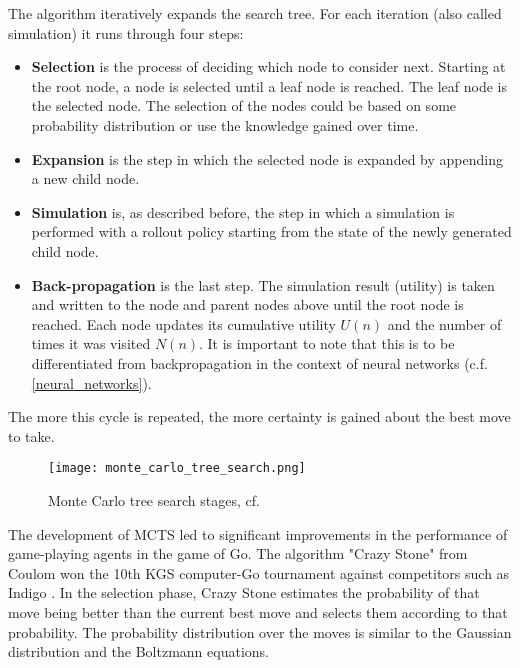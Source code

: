 The algorithm iteratively expands the search tree. For each iteration (also called simulation) it runs through four steps:
\begin{itemize}
    \item \textbf{Selection} is the process of deciding which node to consider next. Starting at the root node, a node is selected until a leaf node is reached. The leaf node is the selected node. The selection of the nodes could be based on some probability distribution or use the knowledge gained over time.

    \item \textbf{Expansion} is the step in which the selected node is expanded by appending a new child node.

    \item \textbf{Simulation} is, as described before, the step in which a simulation is performed with a rollout policy starting from the state of the newly generated child node.

    \item \textbf{Back-propagation} is the last step. The simulation result (utility) is taken and written to the node and parent nodes above until the root node is reached. Each node updates its cumulative utility $U(n)$ and the number of times it was visited $N(n)$. It is important to note that this is to be differentiated from backpropagation in the context of neural networks (c.f. \ref{neural_networks}).
\end{itemize}

The more this cycle is repeated, the more certainty is gained about the best move to take.

\begin{figure}
    \centering
    \texttt{[image: monte\_carlo\_tree\_search.png]}
    \caption{Monte Carlo tree search stages, cf. \cite{noauthor_fig_nodate}}
    \label{monte_carlo_tree_search}
\end{figure}

The development of MCTS led to significant improvements in the performance of game-playing agents in the game of Go. The algorithm "Crazy Stone" from Coulom won the 10th KGS computer-Go tournament against competitors such as Indigo \cite{bouzy_associating_2006}. In the selection phase, Crazy Stone estimates the probability of that move being better than the current best move and selects them according to that probability. The probability distribution over the moves is similar to the Gaussian distribution and the Boltzmann equations. \cite[p. 4]{coulom_efficient_2007}

